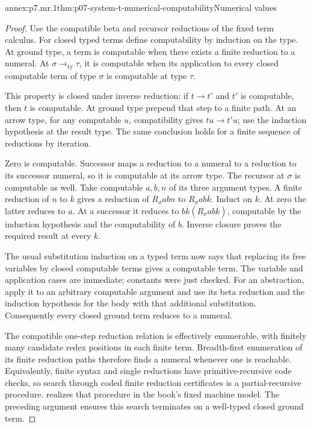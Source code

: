 \begin{annexitem}{annex:p7.mr.1}{thm:p07-system-t-numerical-computability}{Numerical values}
\begin{proof}
Use the compatible beta and recursor reductions of the fixed term
calculus. For closed typed terms define computability by induction on
the type. At ground type, a term is computable when there exists a
finite reduction to a numeral. At \(\sigma\to_{\mathrm{ty}}\tau\),
it is computable when its application to every closed computable term
of type \(\sigma\) is computable at type \(\tau\).

This property is closed under inverse reduction: if \(t\to t'\)
and \(t'\) is computable, then \(t\) is computable. At ground type
prepend that step to a finite path. At an arrow type, for any computable
\(u\), compatibility gives \(tu\to t'u\); use the induction
hypothesis at the result type. The same conclusion holds for a finite
sequence of reductions by iteration.

Zero is computable. Successor maps a reduction to a numeral to a
reduction to its successor numeral, so it is computable at its arrow
type. The recursor at \(\sigma\) is computable as well. Take
computable \(a,b,n\) of its three argument types. A finite reduction
of \(n\) to \(\overline k\) gives a reduction of
\(R_\sigma a b n\) to \(R_\sigma a b\overline k\).
Induct on \(k\). At zero the latter reduces to \(a\). At a
successor it reduces to
\(b\overline k(R_\sigma a b\overline k)\), computable by the
induction hypothesis and the computability of \(b\). Inverse
closure proves the required result at every \(k\).

The usual substitution induction on a typed term now says that
replacing its free variables by closed computable terms gives a
computable term. The variable and application cases are immediate;
constants were just checked. For an abstraction, apply it to an
arbitrary computable argument and use its beta reduction and the
induction hypothesis for the body with that additional substitution.
Consequently every closed ground term reduces to a numeral.

The compatible one-step reduction relation is effectively enumerable,
with finitely many candidate redex positions in each finite term.
Breadth-first enumeration of its finite reduction paths therefore
finds a numeral whenever one is reachable. Equivalently, finite syntax
and single reductions have primitive-recursive code checks, so search
through coded finite reduction certificates is a partial-recursive
procedure.  realizes that procedure
in the book's fixed machine model. The preceding argument
ensures this search terminates on a well-typed closed ground term.


\end{proof}
\end{annexitem}
